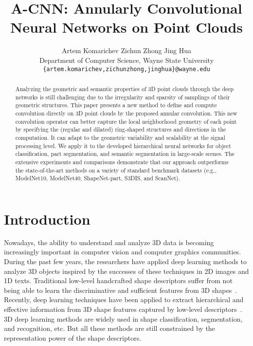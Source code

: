 \documentclass[10pt,twocolumn,letterpaper]{article}
\date{}
\begin{document}
\title{A-CNN: Annularly Convolutional Neural Networks on Point Clouds}

\author{Artem Komarichev \qquad Zichun Zhong \qquad Jing Hua\\
Department of Computer Science, Wayne State University\\
{\tt\small \{artem.komarichev,zichunzhong,jinghua\}@wayne.edu} }

\maketitle



\begin{abstract}
  Analyzing the geometric and semantic properties of 3D point clouds through the deep networks is still challenging due to the irregularity and sparsity of samplings of their geometric structures. This paper presents a new method to define and compute convolution directly on 3D point clouds by the proposed annular convolution. This new convolution operator can better capture the local neighborhood geometry of each point by specifying the (regular and dilated) ring-shaped structures and directions in the computation. It can adapt to the geometric variability and scalability at the signal processing level. We apply it to the developed hierarchical neural networks for object classification, part segmentation, and semantic segmentation in large-scale scenes. The extensive experiments and comparisons demonstrate that our approach outperforms the state-of-the-art methods on a variety of standard benchmark datasets (e.g., ModelNet10, ModelNet40, ShapeNet-part, S3DIS, and ScanNet).
\end{abstract}
\vspace{-0.5cm}

\section{Introduction} 
Nowadays, the ability to understand and analyze 3D data is becoming increasingly important in computer vision and computer graphics communities. During the past few years, the researchers have applied deep learning methods to analyze 3D objects inspired by the successes of these techniques in 2D images and 1D texts. Traditional low-level handcrafted shape descriptors suffer from not being able to learn the discriminative and sufficient features from 3D shapes~\cite{ahmed2018deep}. Recently, deep learning techniques have been applied to extract hierarchical and effective information from 3D shape features captured by low-level descriptors~\cite{liu2014high,bu2015local}. 3D deep learning methods are widely used in shape classification, segmentation, and recognition, etc. But all these methods are still constrained by the representation power of the shape descriptors.
\end{document}
